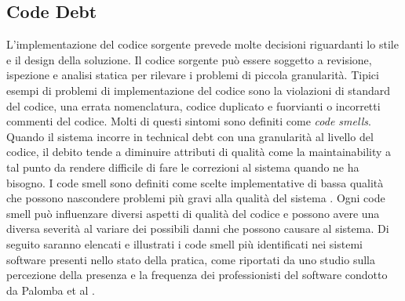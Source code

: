 \subsection{Code Debt}
\label{sec:code_debt}
L'implementazione del codice sorgente prevede molte decisioni riguardanti lo stile e il design della soluzione. Il codice sorgente può essere soggetto a revisione, ispezione e analisi statica per rilevare i problemi di piccola granularità. Tipici esempi di problemi di implementazione del codice sono la violazioni di standard del codice, una errata nomenclatura, codice duplicato e fuorvianti o incorretti commenti del codice.
Molti di questi sintomi sono definiti come \textit{code smells}. Quando il sistema incorre in technical debt con una granularità al livello del codice, il debito tende a diminuire attributi di qualità come la maintainability a tal punto da rendere difficile di fare le correzioni al sistema quando ne ha bisogno.
I code smell sono definiti come scelte implementative di bassa qualità che possono nascondere problemi più gravi alla qualità del sistema \cite{FowlerCodeSmell}.
Ogni code smell può influenzare diversi aspetti di qualità del codice e possono avere una diversa severità al variare dei possibili danni che possono causare al sistema.
Di seguito saranno elencati e illustrati i code smell più identificati nei sistemi software presenti nello stato della pratica, come riportati da uno studio sulla percezione della presenza e la frequenza dei professionisti del software condotto da Palomba et al \cite{PalombaCodeSmells}.
